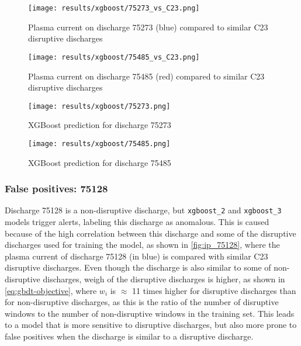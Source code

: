 \begin{figure}[H]
    \centering
    \texttt{[image: results/xgboost/75273\_vs\_C23.png]}
    \caption{Plasma current on discharge 75273 (blue) compared to similar C23 disruptive discharges}
    \label{fig:ip_75273}
\end{figure}

\begin{figure}[H]
    \centering
    \texttt{[image: results/xgboost/75485\_vs\_C23.png]}
    \caption{Plasma current on discharge 75485 (red) compared to similar C23 disruptive discharges}
    \label{fig:ip_75485}
\end{figure}

\begin{figure}[H]
    \centering
    \texttt{[image: results/xgboost/75273.png]}
    \caption{XGBoost prediction for discharge 75273}
    \label{fig:xgboost-75273}
\end{figure}

\begin{figure}[H]
    \centering
    \texttt{[image: results/xgboost/75485.png]}
    \caption{XGBoost prediction for discharge 75485}
    \label{fig:xgboost-75485}
\end{figure}

\subsubsection{False positives: 75128}

Discharge 75128 is a non-disruptive discharge, but \texttt{xgboost\_2} and \texttt{xgboost\_3} models trigger alerts, labeling this discharge as anomalous. This is caused because of the high correlation between this discharge and some of the disruptive discharges used for training the model, as shown in \autoref{fig:ip_75128}, where the plasma current of discharge 75128 (in blue) is compared with similar C23 disruptive discharges. Even though the discharge is also similar to some of non-disruptive discharges, weigh of the disruptive discharges is higher, as shown in \autoref{eq:gbdt-objective}, where $w_i$ is $\approx$ 11 times higher for disruptive discharges than for non-disruptive discharges, as this is the ratio of the number of disruptive windows to the number of non-disruptive windows in the training set. This leads to a model that is more sensitive to disruptive discharges, but also more prone to false positives when the discharge is similar to a disruptive discharge. 

